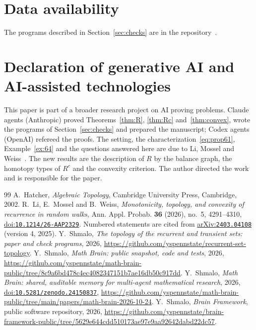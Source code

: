 \documentclass[11pt]{amsart}
\theoremstyle{remark}
\newcommand{\doi}[1]{\href{https://doi.org/#1}{doi:\nolinkurl{#1}}}
\newcommand{\arxiv}[1]{\href{https://arxiv.org/abs/#1}{arXiv:\nolinkurl{#1}}}
\begin{document}
\section*{Data availability}
The programs described in Section~\ref{sec:checks} are in the repository~\cite{Repo}.

\section*{Declaration of generative AI and AI-assisted technologies}
This paper is part of a broader research project on AI proving problems. Claude agents (Anthropic) proved
Theorems~\ref{thm:R}, \ref{thm:Rc} and~\ref{thm:convex}, wrote the programs of Section~\ref{sec:checks} and prepared
the manuscript; Codex agents (OpenAI) refereed the proofs. The setting, the characterization~\eqref{eq:prop61},
Example~\ref{ex:64} and the questions answered here are due to Li, Mossel and Weiss~\cite{LMW}. The new results are
the description of $R$ by the balance graph, the homotopy types of $R^c$ and the convexity criterion. The author
directed the work and is responsible for the paper.

\begin{thebibliography}{99}
 A.~Hatcher, \emph{Algebraic Topology}, Cambridge University Press, Cambridge, 2002.
 R.~Li, E.~Mossel and B.~Weiss, \emph{Monotonicity, topology, and convexity of recurrence in random
walks}, Ann. Appl. Probab. \textbf{36} (2026), no.~5, 4291--4310, \doi{10.1214/26-AAP2329}. Numbered
statements are cited from \arxiv{2403.04108} (version 4, 2025).
 Y.~Shmalo, \emph{The topology of the recurrent and transient sets: paper and check programs}, 2026,
\url{https://github.com/yspennstate/recurrent-set-topology}.
 Y.~Shmalo, \emph{Math Brain: public snapshot, code and tests}, 2026,
\url{https://github.com/yspennstate/math-brain-public/tree/8c9a6bd478c4ec4082347151b7ae16db50c917dd}.
 Y.~Shmalo, \emph{Math Brain: shared, auditable memory for multi-agent mathematical research},
2026, \doi{10.5281/zenodo.24150837},
\url{https://github.com/yspennstate/math-brain-public/tree/main/papers/math-brain-2026-10-24}.
 Y.~Shmalo, \emph{Brain Framework}, public software repository, 2026,
\url{https://github.com/yspennstate/brain-framework-public/tree/5629e644cdd510173ae97e9aa92642dabd22dc57}.
\end{thebibliography}
\end{document}
